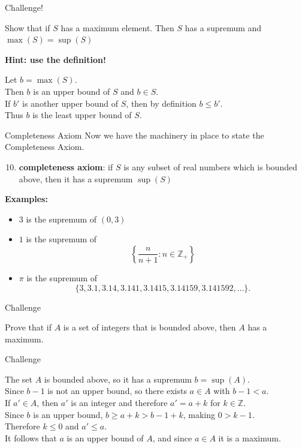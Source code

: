 \documentclass{beamer}
\begin{document}
\begin{frame}{Challenge!}
\begin{prob}
Show that if $S$ has a maximum element.  Then $S$ has a supremum and $\max(S)=\sup(S)$
\end{prob}
\pause
\textbf{Hint: use the definition!}
\pause
\begin{soln}
Let $b=\max(S)$.\\
\pause
Then $b$ is an upper bound of $S$ and $b\in S$.\\
\pause
If $b'$ is another upper bound of $S$, then by definition $b\leq b'$.\\
\pause
Thus $b$ is the least upper bound of $S$.
\end{soln}
\end{frame}

\begin{frame}{Completeness Axiom}
Now we have the machinery in place to state the Completeness Axiom.
\pause
\begin{enumerate}[\text{A}1]
\setcounter{enumi}{9}
\pause
\item \textbf{completeness axiom}: if $S$ is any subset of real numbers which is bounded above, then it has a supremum $\sup(S)$
\end{enumerate}
\pause
\textbf{Examples:}
\begin{itemize}
\pause
\item $3$ is the supremum of $(0,3)$
\pause
\item $1$ is the supremum of
$$\left\lbrace
\frac{n}{n+1}: n\in\mathbb{Z}_+
\right\rbrace$$
\pause
\item $\pi$ is the supremum of
$$\{3,3.1,3.14,3.141,3.1415,3.14159,3.141592,\dots\}.$$
\end{itemize}
\end{frame}

\begin{frame}{Challenge}
\begin{prob}
Prove that if $A$ is a set of integers that is bounded above, then $A$ has a maximum.
\end{prob}
\end{frame}

\begin{frame}{Challenge}
\begin{soln}
The set $A$ is bounded above, so it has a supremum $b=\sup(A)$. \\
\pause
Since $b-1$ is not an upper bound, so there exists $a\in A$ with $b-1 < a$. \\
\pause
If $a'\in A$, then $a'$ is an integer and therefore $a' = a+k$ for $k\in \mathbb{Z}$. \\
\pause
Since $b$ is an upper bound, $b\geq a+k>b-1+k$, making $0 > k-1$. \\
\pause
Therefore $k\leq 0$ and $a'\leq a$. \\
\pause
It follows that $a$ is an upper bound of $A$, and since $a\in A$ it is a maximum.
\end{soln}
\end{frame}
\end{document}
